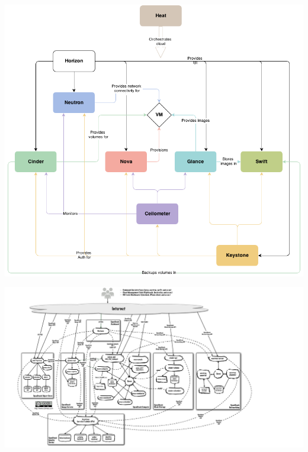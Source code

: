 \begin{frame}
\begin{center}
\href{http://docs.openstack.org/trunk/install-guide/install/apt/content/figures/1/figures/openstack\_havana\_conceptual\_arch.png}
     {\includegraphics[width=\textwidth]{images/openstack_havana_conceptual_arch.png}}
\end{center}
\end{frame}



\begin{frame}
\begin{center}
\href{http://docs.openstack.org/trunk/install-guide/install/apt/content/figures/2/figures/openstack-arch-havana-logical-v1.jpg}
     {\includegraphics[width=\textwidth]{images/openstack-arch-havana-logical-v1.jpg}}
\end{center}
\end{frame}

